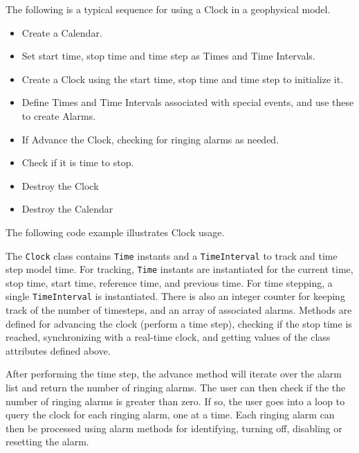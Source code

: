 
The following is a typical sequence for using a Clock in a 
geophysical model.

\begin{itemize}
\item Create a Calendar.
\item Set start time, stop time and time step as Times and 
Time Intervals.
\item Create a Clock using the start time, stop time and time
step to initialize it.
\item Define Times and Time Intervals associated with special
events, and use these to create Alarms.
\end{itemize}

\begin{itemize}
\item If Advance the Clock, checking for ringing alarms as needed.
\item Check if it is time to stop.
\end{itemize}

\begin{itemize}
\item Destroy the Clock 
\item Destroy the Calendar
\end{itemize}

The following code example illustrates Clock usage.




The {\tt Clock} class contains {\tt Time} instants and a {\tt TimeInterval}
to track and time step model time.  For tracking, {\tt Time} instants are
instantiated for the current time, stop time, start time, reference time,
and previous time.  For time stepping, a single {\tt TimeInterval} is
instantiated.  There is also an integer counter for keeping track of the
number of timesteps, and an array of associated alarms.  Methods are
defined for advancing the clock (perform a time step), checking if the
stop time is reached, synchronizing with a real-time clock, and getting
values of the class attributes defined above.

After performing the time step, the advance method will iterate over the
alarm list and return the number of ringing alarms.  The user can then check
if the the number of ringing alarms is greater than zero.  If so, the user
goes into a loop to query the clock for each ringing alarm, one at a time.
Each ringing alarm can then be processed using alarm methods for identifying,
turning off, disabling or resetting the alarm.
